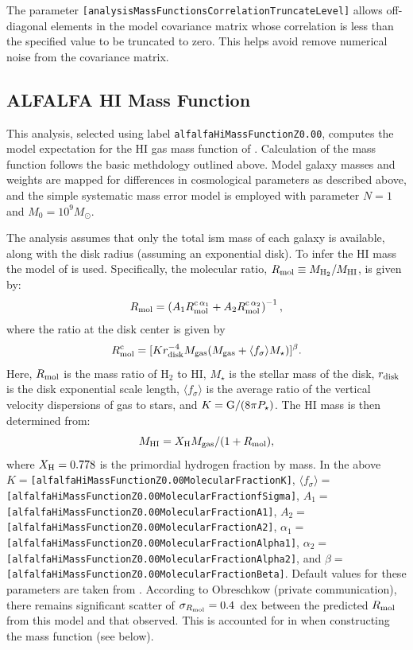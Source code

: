 The parameter {\tt [analysisMassFunctionsCorrelationTruncateLevel]} allows off-diagonal elements in the model covariance matrix whose correlation is less than the specified value to be truncated to zero. This helps avoid remove numerical noise from the covariance matrix.

\subsection{ALFALFA HI Mass Function}\label{sec:otfAnalysis:ALFALFA}

This analysis, selected using label {\tt alfalfaHiMassFunctionZ0.00}, computes the model expectation for the HI gas mass function of \cite{martin_arecibo_2010}. Calculation of the mass function follows the basic methdology outlined above. Model galaxy masses and weights are mapped for differences in cosmological parameters as described above, and the simple systematic mass error model is employed with parameter $N=1$ and $M_0=10^9M_\odot$.

The analysis assumes that only the total \gls{ism} mass of each galaxy is available, along with the disk radius (assuming an exponential disk). To infer the HI mass the model of \cite{obreschkow_simulation_2009} is used. Specifically, the molecular ratio, $R_{\rm mol}\equiv M_{\rm H_2}/M_{\rm HI}$, is given by:
\begin{equation}
 R_{\rm mol} = \left( A_1 R_{\rm mol}^{\rm c\,\alpha_1} + A_2 R_{\rm mol}^{\rm c\,\alpha_2} \right)^{-1},
 \label{eq:HIMassSystematic}
\end{equation}
where the ratio at the disk center is given by
\begin{equation}
 R_{\rm mol}^{\rm c} = [ K r_{\rm disk}^{-4} M_{\rm gas} (M_{\rm gas} + \langle f_\sigma \rangle M_\star)]^\beta.
\end{equation}
Here, $R_{\rm mol}$ is the mass ratio of H$_2$ to HI, $M_\star$ is the stellar mass of the disk, $r_{\rm disk}$ is the disk exponential scale length, $\langle f_\sigma \rangle$ is the average ratio of the vertical velocity dispersions of gas to stars, and $K={\rm G}/(8\pi P_\star)$. The HI mass is then determined from:
\begin{equation}
M_{\rm HI} = X_{\rm H} M_{\rm gas} / ( 1 + R_{\rm mol} ),
\end{equation}
where $X_{\rm H}=0.778$ is the primordial hydrogen fraction by mass. In the above $K=${\tt [alfalfaHiMassFunctionZ0.00MolecularFractionK]}, $\langle f_\sigma \rangle=${\tt [alfalfaHiMassFunctionZ0.00MolecularFractionfSigma]}, $A_1=${\tt [alfalfaHiMassFunctionZ0.00MolecularFractionA1]}, $A_2=${\tt [alfalfaHiMassFunctionZ0.00MolecularFractionA2]}, $\alpha_1=${\tt [alfalfaHiMassFunctionZ0.00MolecularFractionAlpha1]}, $\alpha_2=${\tt [alfalfaHiMassFunctionZ0.00MolecularFractionAlpha2]}, and $\beta=${\tt [alfalfaHiMassFunctionZ0.00MolecularFractionBeta]}. Default values for these parameters are taken from \cite{obreschkow_simulation_2009}. According to Obreschkow (private communication), there remains significant scatter of $\sigma_{R_{\rm mol}}=0.4$~dex between the predicted $R_{\rm mol}$ from this model and that observed. This is accounted for in when constructing the mass function (see below).


